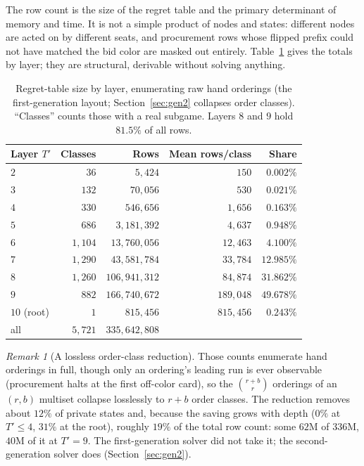 \documentclass[11pt]{article}
\theoremstyle{plain}
\theoremstyle{definition}
\theoremstyle{remark}
\newtheorem{remark}[theorem]{Remark}
\begin{document}
The row count is the size of the regret table and the primary determinant of
memory and time. It is not a simple product of nodes and states: different nodes
are acted on by different seats, and procurement rows whose flipped prefix could
not have matched the bid color are masked out entirely. Table~\ref{tab:rowscale}
gives the totals by layer; they are structural, derivable without solving
anything.

\begin{table}[htbp]
\centering
\caption{Regret-table size by layer, enumerating raw hand orderings
(the first-generation layout; Section~\ref{sec:gen2} collapses order
classes). ``Classes'' counts those with a real subgame. Layers $8$
and $9$ hold $81.5\%$ of all rows.}
\label{tab:rowscale}
\begin{tabular}{@{}lrrrr@{}}
\toprule
Layer $T'$ & Classes & Rows & Mean rows/class & Share\\
\midrule
$2$ & $36$ & $5{,}424$ & $150$ & $0.002\%$\\
$3$ & $132$ & $70{,}056$ & $530$ & $0.021\%$\\
$4$ & $330$ & $546{,}656$ & $1{,}656$ & $0.163\%$\\
$5$ & $686$ & $3{,}181{,}392$ & $4{,}637$ & $0.948\%$\\
$6$ & $1{,}104$ & $13{,}760{,}056$ & $12{,}463$ & $4.100\%$\\
$7$ & $1{,}290$ & $43{,}581{,}784$ & $33{,}784$ & $12.985\%$\\
$8$ & $1{,}260$ & $106{,}941{,}312$ & $84{,}874$ & $31.862\%$\\
$9$ & $882$ & $166{,}740{,}672$ & $189{,}048$ & $49.678\%$\\
$10$ (root) & $1$ & $815{,}456$ & $815{,}456$ & $0.243\%$\\
\midrule
all & $5{,}721$ & $335{,}642{,}808$ & & \\
\bottomrule
\end{tabular}
\end{table}

\begin{remark}[A lossless order-class reduction]\label{rem:orderclass}
Those counts enumerate hand orderings in full, though only an
ordering's leading run is ever observable (procurement halts at the
first off-color card), so the $\binom{r+b}{r}$ orderings of an $(r,b)$
multiset collapse losslessly to $r+b$ order classes. The reduction
removes about $12\%$ of private states and, because the saving grows
with depth ($0\%$ at $T'\le4$, $31\%$ at the root), roughly $19\%$ of
the total row count: some $62$M of $336$M, $40$M of it at $T'=9$. The
first-generation solver did not take it; the second-generation solver
does (Section~\ref{sec:gen2}).
\end{remark}
\end{document}
